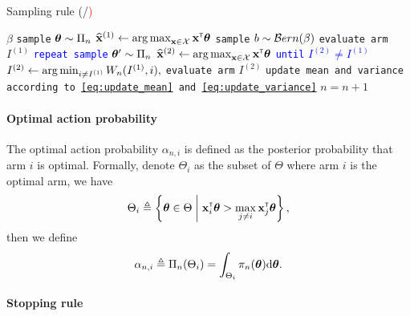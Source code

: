 \begin{algorithm}[ht]
\centering
\caption{Sampling rule (\textcolor{blue}{\LTCS}/\textcolor{red}{\LTCC)}}
\label{alg:sampling_rule}
\begin{algorithmic}[1]
    $\beta$ %
        \State \texttt{sample} ${\boldsymbol \theta} \sim \Pi_n$
        \State $\widehat{{\bf x}}^{(1)} \leftarrow \operatorname*{arg\,max}_{{\bf x}\in\mathcal{X}} {\bf x}^\mathsf{\scriptscriptstyle T}{\boldsymbol \theta}$ 
	    \State \texttt{sample} $b \sim \mathcal{B} ern(\beta)$
	        \State \texttt{evaluate arm} $I^{(1)}$
	    \Else
	        \State \textcolor{blue}{\texttt{repeat sample} ${\boldsymbol \theta}' \sim \Pi_n$}%
            \State \textcolor{blue}{$\widehat{{\bf x}}^{(2)} \leftarrow \operatorname*{arg\,max}_{{\bf x}\in\mathcal{X}} {\bf x}^\mathsf{\scriptscriptstyle T}{\boldsymbol \theta}$ }\Comment{\textcolor{blue}{\LTCS}}
	        \State \textcolor{blue}{\texttt{until} $I^{(2)} \neq I^{(1)}$}%
	        \State \textcolor{red}{$I^{(2)} \leftarrow \operatorname*{arg\,min}_{i\neq I^{(1)}}W_n(I^{(1)},i), $ }\Comment{\textcolor{red}{\LTCC}}%
		    \State \texttt{evaluate arm} $I^{(2)}$
	    \EndIf
	    \State \texttt{update mean and variance according to \eqref{eq:update_mean} and \eqref{eq:update_variance}}
	    \State $n = n+1$
   \EndFor
\end{algorithmic}
\end{algorithm}

\paragraph{Optimal action probability} The optimal action probability $\alpha_{n,i}$ is defined as the posterior probability that arm $i$ is optimal. Formally, denote $\Theta_i$ as the subset of $\Theta$ where arm $i$ is the optimal arm, we have
\[
    \Theta_i \triangleq \left\{ {\boldsymbol \theta}\in\Theta \biggm| {\bf x}_i^\mathsf{\scriptscriptstyle T}{\boldsymbol \theta} > \max_{j\neq i}{\bf x}_j^\mathsf{\scriptscriptstyle T}{\boldsymbol \theta} \right\},
\]
then we define
\[
   \alpha_{n,i} \triangleq \Pi_{n}(\Theta_i) = \int_{\Theta_i} \pi_n({\boldsymbol \theta}) \text{d} {\boldsymbol \theta}.
\]

\paragraph{Stopping rule}


